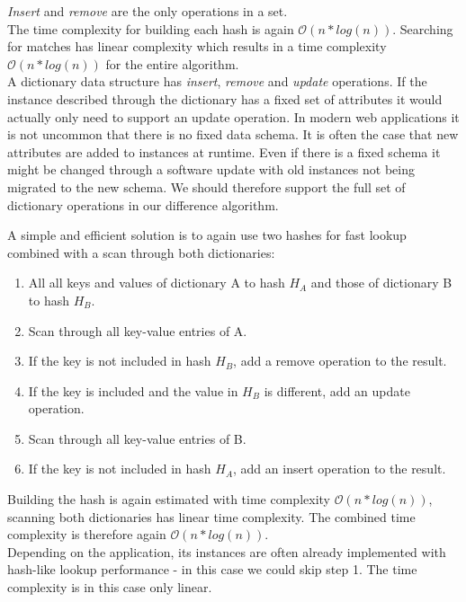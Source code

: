 \emph{Insert} and \emph{remove} are the only operations in a set.\\
The time complexity for building each hash is again $ \mathcal O(n * log(n)) $.
Searching for matches has linear complexity which results in a time complexity $ \mathcal O(n * log(n)) $ for the entire algorithm.\\

A dictionary data structure has \emph{insert}, \emph{remove} and \emph{update} operations.
If the instance described through the dictionary has a fixed set of attributes it would actually only need to support an update operation.
In modern web applications it is not uncommon that there is no fixed data schema.
It is often the case that new attributes are added to instances at runtime.
Even if there is a fixed schema it might be changed through a software update with old instances not being migrated to the new schema.
We should therefore support the full set of dictionary operations in our difference algorithm.

A simple and efficient solution is to again use two hashes for fast lookup combined with a scan through both dictionaries:

\begin{enumerate}
\item All all keys and values of dictionary A to hash $ H_A $ and those of dictionary B to hash $ H_B $.
\item Scan through all key-value entries of A.
\item If the key is not included in hash $ H_B $, add a remove operation to the result.
\item If the key is included and the value in $ H_B $ is different, add an update operation.
\item Scan through all key-value entries of B.
\item If the key is not included in hash $ H_A $, add an insert operation to the result.
\end{enumerate}

Building the hash is again estimated with time complexity $ \mathcal O(n * log(n)) $, scanning both dictionaries has linear time complexity. The combined time complexity is therefore again $ \mathcal O(n * log(n)) $.\\
Depending on the application, its instances are often already implemented with hash-like lookup performance - in this case we could skip step 1.
The time complexity is in this case only linear.\\

